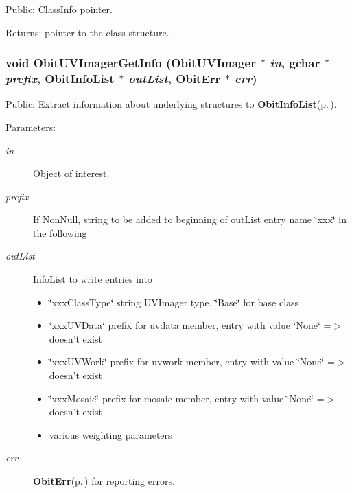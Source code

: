 Public: Class\-Info pointer. 

\begin{Desc}
\item[Returns:]pointer to the class structure. \end{Desc}
\subsubsection{\setlength{\rightskip}{0pt plus 5cm}void Obit\-UVImager\-Get\-Info ({\bf Obit\-UVImager} $\ast$ {\em in}, gchar $\ast$ {\em prefix}, {\bf Obit\-Info\-List} $\ast$ {\em out\-List}, {\bf Obit\-Err} $\ast$ {\em err})}\label{ObitUVImager_8h_a23}


Public: Extract information about underlying structures to {\bf Obit\-Info\-List}{\rm (p.\,\pageref{structObitInfoList})}. 

\begin{Desc}
\item[Parameters:]
\begin{description}
\item[{\em in}]Object of interest. \item[{\em prefix}]If Non\-Null, string to be added to beginning of out\-List entry name \char`\"{}xxx\char`\"{} in the following \item[{\em out\-List}]Info\-List to write entries into \begin{itemize}
\item \char`\"{}xxx\-Class\-Type\char`\"{} string UVImager type, \char`\"{}Base\char`\"{} for base class \item \char`\"{}xxx\-UVData\char`\"{} prefix for uvdata member, entry with value \char`\"{}None\char`\"{} =$>$ doesn't exist \item \char`\"{}xxx\-UVWork\char`\"{} prefix for uvwork member, entry with value \char`\"{}None\char`\"{} =$>$ doesn't exist \item \char`\"{}xxx\-Mosaic\char`\"{} prefix for mosaic member, entry with value \char`\"{}None\char`\"{} =$>$ doesn't exist \item various weighting parameters \end{itemize}
\item[{\em err}]{\bf Obit\-Err}{\rm (p.\,\pageref{structObitErr})} for reporting errors. \end{description}
\end{Desc}
